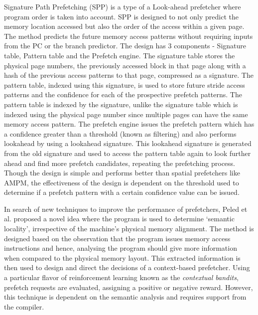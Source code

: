 \documentclass[10pt,conference]{IEEEtran}
\begin{document}
Signature Path Prefetching \cite{SPP} (SPP) is a type of a Look-ahead prefetcher where program order is taken into account. SPP is designed to not only predict the memory location accessed but also the order of the access within a given page. The method predicts the future memory access patterns without requiring inputs from the PC or the branch predictor. The design has 3 components - Signature table, Pattern table and the Prefetch engine. The signature table stores the physical page numbers, the previously accessed block in that page along with a hash of the previous access patterns to that page, compressed as a signature. The pattern table, indexed using this signature, is used to store future stride access patterns and the confidence for each of the prospective prefetch patterns. The pattern table is indexed by the signature, unlike the signature table which is indexed using the physical page number since multiple pages can have the same memory access pattern. The prefetch engine issues the prefetch pattern which has a confidence greater than a threshold (known as filtering) and also performs lookahead by using a lookahead signature. This lookahead signature is generated from the old signature and used to access the pattern table again to look further ahead and find more prefetch candidates, repeating the prefetching process. Though the design is simple and performs better than spatial prefetchers like AMPM\cite{AMPM}, the effectiveness of the design is dependent on the threshold used to determine if a prefetch pattern with a certain confidence value can be issued.

In search of new techniques to improve the performance of prefetchers, Peled et al. \cite{semantic-locality} proposed a novel idea where the program is used to determine `semantic locality', irrespective of the machine's physical memory alignment. The method is designed based on the observation that the program issues memory access instructions and hence, analysing the program should give more information when compared to the physical memory layout. This extracted information is then used to design and direct the decisions of a context-based prefetcher. Using a particular flavor of reinforcement learning known as the \textit{contextual bandits},  prefetch requests are evaluated, assigning a positive or negative reward. However, this technique is dependent on the semantic analysis and requires support from the compiler. 
\end{document}
